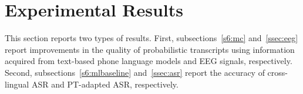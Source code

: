 \section{Experimental Results}
\label{sec:results}

This section reports two types of results.  First,
subsections~\ref{s6:mc} and~\ref{ssec:eeg} report improvements in the
quality of probabilistic transcripts using information acquired from
text-based phone language models and EEG signals, respectively.
Second, subsections~\ref{s6:mlbaseline} and~\ref{ssec:asr} report the
accuracy of cross-lingual ASR and PT-adapted ASR, respectively.

